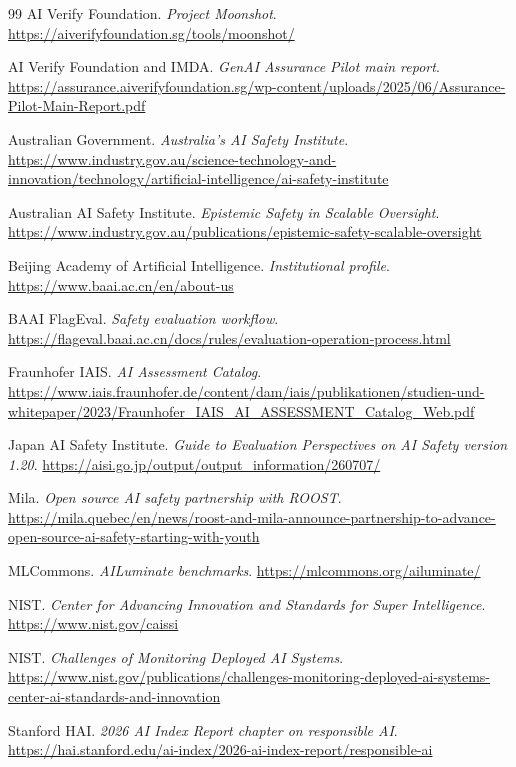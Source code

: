 \begin{thebibliography}{99}
AI Verify Foundation. \textit{Project Moonshot}.
\url{https://aiverifyfoundation.sg/tools/moonshot/}

AI Verify Foundation and IMDA. \textit{GenAI Assurance Pilot main report}.
\url{https://assurance.aiverifyfoundation.sg/wp-content/uploads/2025/06/Assurance-Pilot-Main-Report.pdf}

Australian Government. \textit{Australia's AI Safety Institute}.
\url{https://www.industry.gov.au/science-technology-and-innovation/technology/artificial-intelligence/ai-safety-institute}

Australian AI Safety Institute. \textit{Epistemic Safety in Scalable Oversight}.
\url{https://www.industry.gov.au/publications/epistemic-safety-scalable-oversight}

Beijing Academy of Artificial Intelligence. \textit{Institutional profile}.
\url{https://www.baai.ac.cn/en/about-us}

BAAI FlagEval. \textit{Safety evaluation workflow}.
\url{https://flageval.baai.ac.cn/docs/rules/evaluation-operation-process.html}

Fraunhofer IAIS. \textit{AI Assessment Catalog}.
\url{https://www.iais.fraunhofer.de/content/dam/iais/publikationen/studien-und-whitepaper/2023/Fraunhofer_IAIS_AI_ASSESSMENT_Catalog_Web.pdf}

Japan AI Safety Institute. \textit{Guide to Evaluation Perspectives on AI Safety version 1.20}.
\url{https://aisi.go.jp/output/output_information/260707/}

Mila. \textit{Open source AI safety partnership with ROOST}.
\url{https://mila.quebec/en/news/roost-and-mila-announce-partnership-to-advance-open-source-ai-safety-starting-with-youth}

MLCommons. \textit{AILuminate benchmarks}.
\url{https://mlcommons.org/ailuminate/}

NIST. \textit{Center for Advancing Innovation and Standards for Super Intelligence}.
\url{https://www.nist.gov/caissi}

NIST. \textit{Challenges of Monitoring Deployed AI Systems}.
\url{https://www.nist.gov/publications/challenges-monitoring-deployed-ai-systems-center-ai-standards-and-innovation}

Stanford HAI. \textit{2026 AI Index Report chapter on responsible AI}.
\url{https://hai.stanford.edu/ai-index/2026-ai-index-report/responsible-ai}


\end{thebibliography}
